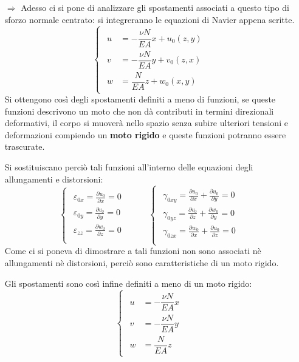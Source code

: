 \begin{itemize}
 	\item[$\Rightarrow$] Adesso ci si pone di analizzare gli spostamenti associati a questo tipo di sforzo normale centrato: si integreranno le equazioni di Navier appena scritte.
 \[ \begin{cases}
 	\begin{aligned}
 	u & = -\dfrac{\nu N}{EA}x + u_0(z,y) \\
 	v & = -\dfrac{\nu N}{EA}y + v_0(z,x) \\
 	w & = \dfrac{N}{EA}z + w_0(x,y)
 	\end{aligned}
 \end{cases} \]
	Si ottengono così degli spostamenti definiti a meno di funzioni, se queste funzioni descrivono un moto che non dà contributi in termini direzionali deformativi, il corpo si muoverà nello spazio senza subire ulteriori tensioni e deformazioni compiendo un \textbf{moto rigido} e queste funzioni potranno essere trascurate. 
	
	Si sostituiscano perciò tali funzioni all'interno delle equazioni degli allungamenti e distorsioni:
		\[ 
	\begin{cases}
		\begin{aligned}
			\varepsilon_{0x} =   \frac{\partial u_0}{\partial x} = 0 \\
			\varepsilon_{0y} =   \frac{\partial v_0}{\partial y} = 0 \\
			\varepsilon_{zz} =   \frac{\partial w_0}{\partial z} = 0 \\
		\end{aligned}
	\end{cases} \hspace{1cm} \begin{cases}
		\begin{aligned}
			\gamma_{0xy} =   \frac{\partial u_0}{\partial x} + \frac{\partial u_0}{\partial y} = 0\\
			\gamma_{0yz} =   \frac{\partial v_0}{\partial z} + \frac{\partial w_0}{\partial y} =  0 \\
			\gamma_{0zx} =   \frac{\partial w_0}{\partial x} + \frac{\partial u_0}{\partial z} =  0 \\
		\end{aligned}
	\end{cases}
	\]
	Come ci si poneva di dimostrare a tali funzioni non sono associati nè allungamenti nè distorsioni, perciò sono caratteristiche di un moto rigido. \newline
	
	Gli spostamenti sono così infine definiti a meno di un moto rigido:
	\begin{equation}		 
	\boxed{	\begin{cases}
		\begin{aligned}
			u & = -\dfrac{\nu N}{EA}x  \\
			v & = -\dfrac{\nu N}{EA}y  \\
			w & = \dfrac{N}{EA}z 
		\end{aligned}
	\end{cases}}
	\end{equation}

\end{itemize}
